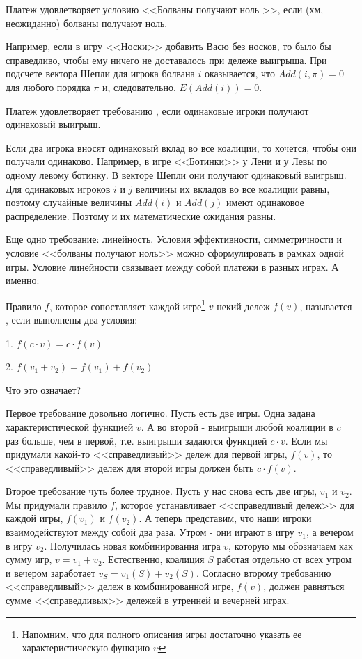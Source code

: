 \begin{mydef} \label{no_bolvans} Платеж удовлетворяет условию <<Болваны получают ноль >>, если (хм, неожиданно) болваны получают ноль.
\end{mydef}

Например, если в игру <<Носки>> добавить Васю без носков, то было бы справедливо, чтобы ему ничего не доставалось при дележе выигрыша. При подсчете вектора Шепли для игрока болвана $i$ оказывается, что $Add(i,\pi)=0$ для любого порядка $\pi$ и, следовательно, $E(Add(i))=0$.

\begin{mydef} \label{symmetry} Платеж удовлетворяет требованию ,  если одинаковые игроки получают одинаковый выигрыш.
\end{mydef}
Если два игрока вносят одинаковый вклад во все коалиции, то хочется, чтобы они получали одинаково. Например, в игре <<Ботинки>> у Лени и у Левы по одному левому ботинку. В векторе Шепли они получают одинаковый выигрыш. Для одинаковых игроков $i$ и $j$ величины их вкладов во все коалиции равны, поэтому случайные величины $Add(i)$ и $Add(j)$ имеют одинаковое распределение. Поэтому и их математические ожидания равны.  

Еще одно требование: линейность. Условия эффективности, симметричности и условие <<болваны получают ноль>> можно сформулировать в рамках одной игры. Условие линейности связывает между собой платежи в разных играх. А именно:
\begin{mydef} \label{linearity}
Правило $f$, которое сопоставляет каждой игре\footnote{Напомним, что для полного описания игры достаточно указать ее характеристическую функцию $v$} $v$ некий дележ $f(v)$, называется , если выполнены два условия:

1. $f(c\cdot v)=c\cdot f(v)$

2. $f(v_{1}+v_{2})=f(v_{1})+f(v_{2})$
\end{mydef}

Что это означает? 

Первое требование довольно логично. Пусть есть две игры. Одна задана характеристической функцией $v$. А во второй - выигрыши любой коалиции в $c$ раз больше, чем в первой, т.е. выигрыши задаются функцией $c\cdot v$. Если мы придумали какой-то <<справедливый>> дележ для первой игры, $f(v)$, то <<справедливый>> дележ для второй игры должен быть $c\cdot f(v)$.

Второе требование чуть более трудное. Пусть у нас снова есть две игры, $v_{1}$ и $v_{2}$. Мы придумали правило $f$, которое устанавливает <<справедливый дележ>> для каждой игры, $f(v_{1})$ и $f(v_{2})$. А теперь представим, что наши игроки взаимодействуют между собой два раза. Утром - они играют в игру $v_{1}$, а вечером в игру $v_{2}$. Получилась новая комбинировання игра $v$, которую мы обозначаем как сумму игр, $v=v_{1}+v_{2}$. Естественно, коалиция $S$ работая отдельно от всех утром и вечером заработает $v_{S}=v_{1}(S)+v_{2}(S)$. Согласно второму требованию <<справедливый>> дележ в комбинированной игре, $f(v)$, должен равняться сумме <<справедливых>> дележей в утренней и вечерней играх.

